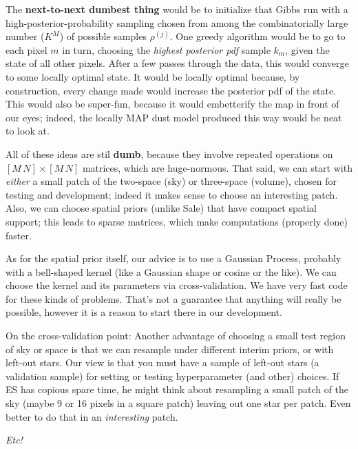 \documentclass[12pt, letterpaper]{article}
\begin{document}
The \textbf{next-to-next dumbest thing} would be to initialize that Gibbs run
  with a high-posterior-probability sampling chosen from among the combinatorially large
  number ($K^M$) of possible samples $\rho^{(j)}$.
One greedy algorithm would be to go to each pixel $m$ in turn,
  choosing the \emph{highest posterior pdf} sample $k_m$,
  given the state of all other pixels.
After a few passes through the data, this would converge
  to some locally optimal state.
It would be locally optimal because, by construction,
  every change made would increase the posterior pdf of the state.
This would also be super-fun, because it would embetterify the map in front of our eyes;
  indeed, the locally MAP dust model produced this way would be neat to look at.

All of these ideas are stil \textbf{dumb},
  because they involve repeated operations on $[M\,N]\times[M\,N]$ matrices,
  which are huge-normous.
That said, we can start with \emph{either}
  a small patch of the two-space (sky) or three-space (volume),
  chosen for testing and development;
  indeed it makes sense to choose an interesting patch.
Also, we can choose spatial priors (unlike Sale)
  that have compact spatial support;
  this leads to sparse matrices,
  which make computations (properly done) faster.

As for the spatial prior itself,
  our advice is to use a Gaussian Process,
  probably with a bell-shaped kernel (like a Gaussian shape or cosine or the like).
We can choose the kernel and its parameters via cross-validation.
We have very fast code for these kinds of problems.
That's not a guarantee that anything will really be possible,
  however it is a reason to start there in our development.

On the cross-validation point:
Another advantage of choosing a small test region of sky or space
  is that we can resample under different interim priors,
  or with left-out stars.
Our view is that you must have a sample of left-out stars
  (a validation sample)
  for setting or testing hyperparameter (and other) choices.
If ES has copious spare time,
  he might think about resampling a small patch of the sky
  (maybe 9 or 16 pixels in a square patch)
  leaving out one star per patch.
Even better to do that in an \emph{interesting} patch.

\textsl{Etc!}
\end{document}
